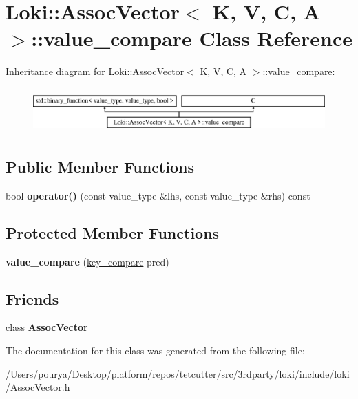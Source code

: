 \hypertarget{classLoki_1_1AssocVector_1_1value__compare}{}\section{Loki\+:\+:Assoc\+Vector$<$ K, V, C, A $>$\+:\+:value\+\_\+compare Class Reference}
\label{classLoki_1_1AssocVector_1_1value__compare}
Inheritance diagram for Loki\+:\+:Assoc\+Vector$<$ K, V, C, A $>$\+:\+:value\+\_\+compare\+:\begin{figure}[H]
\begin{center}
\leavevmode
\includegraphics[height=1.750000cm]{classLoki_1_1AssocVector_1_1value__compare}
\end{center}
\end{figure}
\subsection*{Public Member Functions}
\begin{DoxyCompactItemize}
\item 
\hypertarget{classLoki_1_1AssocVector_1_1value__compare_a9de25e5acf1c8e2effb2ef8c5342f6df}{}bool {\bfseries operator()} (const value\+\_\+type \&lhs, const value\+\_\+type \&rhs) const \label{classLoki_1_1AssocVector_1_1value__compare_a9de25e5acf1c8e2effb2ef8c5342f6df}

\end{DoxyCompactItemize}
\subsection*{Protected Member Functions}
\begin{DoxyCompactItemize}
\item 
\hypertarget{classLoki_1_1AssocVector_1_1value__compare_a33cc0dd9703445ac2e489ce82cbb8ced}{}{\bfseries value\+\_\+compare} (\hyperlink{classC}{key\+\_\+compare} pred)\label{classLoki_1_1AssocVector_1_1value__compare_a33cc0dd9703445ac2e489ce82cbb8ced}

\end{DoxyCompactItemize}
\subsection*{Friends}
\begin{DoxyCompactItemize}
\item 
\hypertarget{classLoki_1_1AssocVector_1_1value__compare_a30d9377561be7f82c6de761e125bc623}{}class {\bfseries Assoc\+Vector}\label{classLoki_1_1AssocVector_1_1value__compare_a30d9377561be7f82c6de761e125bc623}

\end{DoxyCompactItemize}


The documentation for this class was generated from the following file\+:\begin{DoxyCompactItemize}
\item 
/\+Users/pourya/\+Desktop/platform/repos/tetcutter/src/3rdparty/loki/include/loki/Assoc\+Vector.\+h\end{DoxyCompactItemize}

